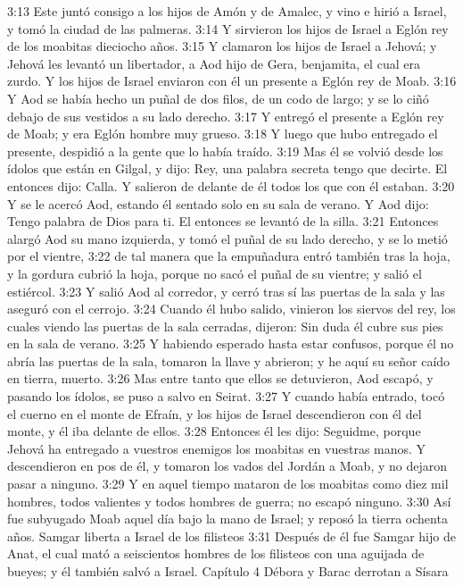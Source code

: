 3:13 Este juntó consigo a los hijos de Amón y de Amalec, y vino e hirió a Israel, y tomó la ciudad de las palmeras.  
3:14 Y sirvieron los hijos de Israel a Eglón rey de los moabitas dieciocho años.  
3:15 Y clamaron los hijos de Israel a Jehová; y Jehová les levantó un libertador, a Aod hijo de Gera, benjamita, el cual era zurdo. Y los hijos de Israel enviaron con él un presente a Eglón rey de Moab.  
3:16 Y Aod se había hecho un puñal de dos filos, de un codo   de largo; y se lo ciñó debajo de sus vestidos a su lado derecho.  
3:17 Y entregó el presente a Eglón rey de Moab; y era Eglón hombre muy grueso.  
3:18 Y luego que hubo entregado el presente, despidió a la gente que lo había traído.  
3:19 Mas él se volvió desde los ídolos que están en Gilgal, y dijo: Rey, una palabra secreta tengo que decirte. El entonces dijo: Calla. Y salieron de delante de él todos los que con él estaban.  
3:20 Y se le acercó Aod, estando él sentado solo en su sala de verano. Y Aod dijo: Tengo palabra de Dios para ti. El entonces se levantó de la silla.  
3:21 Entonces alargó Aod su mano izquierda, y tomó el puñal de su lado derecho, y se lo metió por el vientre,  
3:22 de tal manera que la empuñadura entró también tras la hoja, y la gordura cubrió la hoja, porque no sacó el puñal de su vientre; y salió el estiércol.  
3:23 Y salió Aod al corredor, y cerró tras sí las puertas de la sala y las aseguró con el cerrojo.  
3:24 Cuando él hubo salido, vinieron los siervos del rey, los cuales viendo las puertas de la sala cerradas, dijeron: Sin duda él cubre sus pies en la sala de verano.  
3:25 Y habiendo esperado hasta estar confusos, porque él no abría las puertas de la sala, tomaron la llave y abrieron; y he aquí su señor caído en tierra, muerto.  
3:26 Mas entre tanto que ellos se detuvieron, Aod escapó, y pasando los ídolos, se puso a salvo en Seirat.  
3:27 Y cuando había entrado, tocó el cuerno en el monte de Efraín, y los hijos de Israel descendieron con él del monte, y él iba delante de ellos.  
3:28 Entonces él les dijo: Seguidme, porque Jehová ha entregado a vuestros enemigos los moabitas en vuestras manos. Y descendieron en pos de él, y tomaron los vados del Jordán a Moab, y no dejaron pasar a ninguno.  
3:29 Y en aquel tiempo mataron de los moabitas como diez mil hombres, todos valientes y todos hombres de guerra; no escapó ninguno.  
3:30 Así fue subyugado Moab aquel día bajo la mano de Israel; y reposó la tierra ochenta años.  
Samgar liberta a Israel de los filisteos  
3:31 Después de él fue Samgar hijo de Anat, el cual mató a seiscientos hombres de los filisteos con una aguijada de bueyes; y él también salvó a Israel.  
Capítulo 4 
Débora y Barac derrotan a Sísara  

